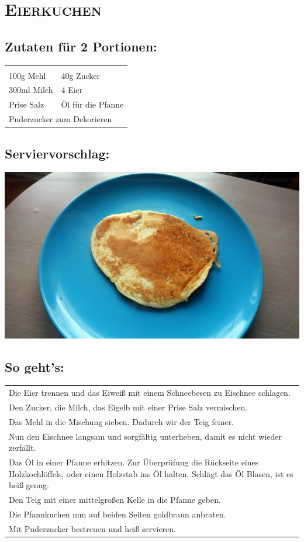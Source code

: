 \section{\textsc{Eierkuchen}}

\subsection*{Zutaten für 2 Portionen:}

\begin{tabular}{p{7.5cm} p{7.5cm}}
	& \\
	100g Mehl & 40g Zucker \\
	300ml Milch & 4 Eier \\
	Prise Salz & Öl für die Pfanne \\
	\multicolumn{2}{l}{Puderzucker zum Dekorieren}
\end{tabular}

\subsection*{Serviervorschlag:}

\includegraphics[width=\textwidth]{img/pancakes/pancakes_gebraten.jpg} \cite{pancakes}

\subsection*{So geht's:}

\begin{tabular}{p{15cm}}
	\\
	Die Eier trennen und das Eiweiß mit einem Schneebesen zu Eischnee schlagen.\\
	Den Zucker, die Milch, das Eigelb mit einer Prise Salz vermischen.\\
	Das Mehl in die Mischung sieben. Dadurch wir der Teig feiner.\\
	Nun den Eischnee langsam und sorgfältig unterheben, damit es nicht wieder zerfällt.\\
	Das Öl in einer Pfanne erhitzen. Zur Überprüfung die Rückseite eines Holzkochlöffels, oder einen Holzstab ins Öl halten. Schlägt das Öl Blasen, ist es heiß genug.\\
	Den Teig mit einer mittelgroßen Kelle in die Pfanne geben.\\
	Die Pfannkuchen nun auf beiden Seiten goldbraun anbraten.\\
	Mit Puderzucker bestreuen und heiß servieren.
\end{tabular}
